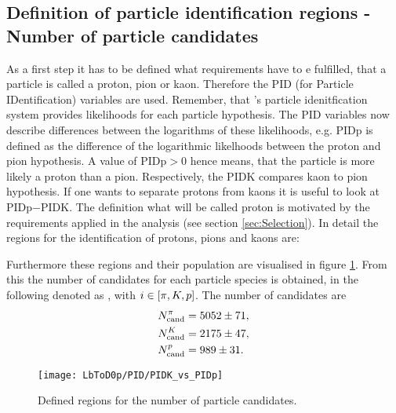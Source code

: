 \subsection{Definition of particle identification regions - Number of particle candidates}
\label{sec:PIDCalib_Ncand}
As a first step it has to be defined what requirements have to e fulfilled, that a particle is called a proton, pion or kaon.
Therefore the PID (for Particle IDentification) variables are used.
Remember, that \lhcb's particle idenitfication system provides likelihoods for each particle hypothesis.
The PID variables now describe differences between the logarithms of these likelihoods, e.g. PIDp is defined as the difference of the logarithmic likelhoods between the proton and pion hypothesis.
A value of PIDp$>0$ hence means, that the particle is more likely a proton than a pion.
Respectively, the PIDK compares kaon to pion hypothesis.
If one wants to separate protons from kaons it is useful to look at PIDp$-$PIDK.
The definition what will be called proton is motivated by the requirements applied in the analysis (see section \ref{sec:Selection}). 
In detail the regions for the identification of protons, pions and kaons are:


Furthermore these regions and their population are visualised in figure \ref{fig:PIDregions}. 
From this the number of candidates for each particle species is obtained, in the following denoted as , with $i \in \left[\pi, {K}, {p}\right]$. 
The number of candidates are
\begin{align}
    N_{\text{cand}}^{\pi}     &= 5052 \pm 71, \\ 
    N_{\text{cand}}^{{K}}   &= 2175 \pm 47, \\ 
    N_{\text{cand}}^{{p}} &= 989 \pm 31.
\end{align}
\begin{figure}[hptb]
	\centering
	\texttt{[image: LbToD0p/PID/PIDK\_vs\_PIDp]}
	\caption{Defined regions for the number of particle candidates.}
	\label{fig:PIDregions}
\end{figure}


